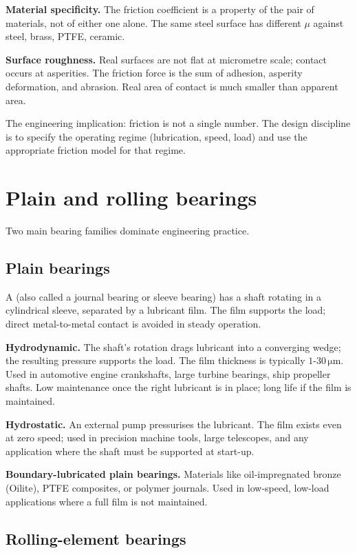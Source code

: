 \textbf{Material specificity.} The friction coefficient is a property of the pair of materials, not of either one alone. The same steel surface has different $\mu$ against steel, brass, PTFE, ceramic.

\textbf{Surface roughness.} Real surfaces are not flat at micrometre scale; contact occurs at asperities. The friction force is the sum of adhesion, asperity deformation, and abrasion. Real area of contact is much smaller than apparent area.

The engineering implication: friction is not a single number. The design discipline is to specify the operating regime (lubrication, speed, load) and use the appropriate friction model for that regime.

\section{Plain and rolling bearings}

Two main bearing families dominate engineering practice.

\subsection{Plain bearings}

A  (also called a journal bearing or sleeve bearing) has a shaft rotating in a cylindrical sleeve, separated by a lubricant film. The film supports the load; direct metal-to-metal contact is avoided in steady operation.

\textbf{Hydrodynamic.} The shaft's rotation drags lubricant into a converging wedge; the resulting pressure supports the load. The film thickness is typically $1$-$30\,\si{\micro\meter}$. Used in automotive engine crankshafts, large turbine bearings, ship propeller shafts. Low maintenance once the right lubricant is in place; long life if the film is maintained.

\textbf{Hydrostatic.} An external pump pressurises the lubricant. The film exists even at zero speed; used in precision machine tools, large telescopes, and any application where the shaft must be supported at start-up.

\textbf{Boundary-lubricated plain bearings.} Materials like oil-impregnated bronze (Oilite), PTFE composites, or polymer journals. Used in low-speed, low-load applications where a full film is not maintained.

\subsection{Rolling-element bearings}

